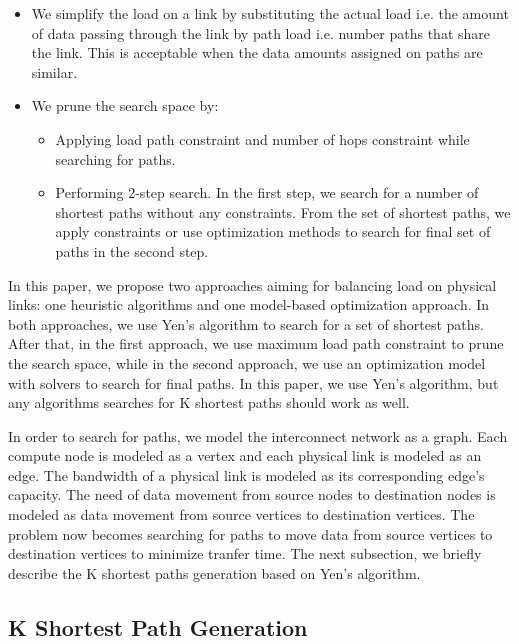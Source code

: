 \begin{itemize}
\item We simplify the load on a link by substituting the actual load i.e. the amount of data passing through the link by path load i.e. number paths that share the link. This is acceptable when the data amounts assigned on paths are similar.
\item We prune the search space by:
\begin{itemize}
\item Applying load path constraint and number of hops constraint while searching for paths.
\item Performing 2-step search. In the first step, we search for a number of shortest paths without any constraints. From the set of shortest paths, we apply constraints or use optimization methods to search for final set of paths in the second step.
\end{itemize}
\end{itemize}

In this paper, we propose two approaches aiming for balancing load on physical links: one heuristic algorithms and one model-based optimization approach. In both approaches, we use Yen's algorithm \cite{Yen:Kpath} to search for a set of shortest paths. After that, in the first approach, we use maximum load path constraint to prune the search space, while in the second approach, we use an optimization model with solvers to search for final paths. In this paper, we use Yen's algorithm, but any algorithms searches for K shortest paths should work as well.

In order to search for paths, we model the interconnect network as a graph. Each compute node is modeled as a vertex and each physical link is modeled as an edge. The bandwidth of a physical link is modeled as its corresponding edge's capacity. The need of data movement from source nodes to destination nodes is modeled as data movement from source vertices to destination vertices. The problem now becomes searching for paths to move data from source vertices to destination vertices to minimize tranfer time. The next subsection, we briefly describe the K shortest paths generation based on Yen's algorithm.

\subsection {K Shortest Path Generation}

